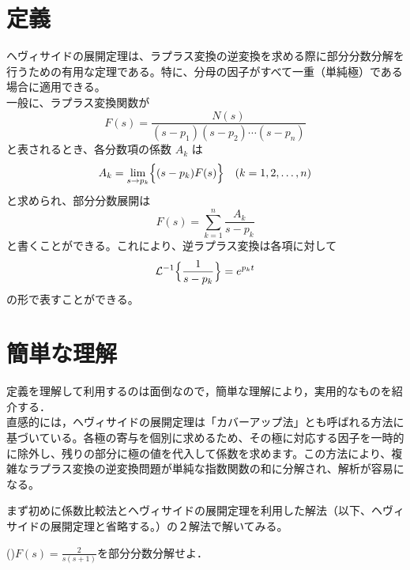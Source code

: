 \documentclass[a4paper,12pt]{report}
\begin{document}
\chapter{定義}
ヘヴィサイドの展開定理は、ラプラス変換の逆変換を求める際に部分分数分解を行うための有用な定理である。特に、分母の因子がすべて一重（単純極）である場合に適用できる。\\[1ex]
一般に、ラプラス変換関数が
\[
F(s) = \frac{N(s)}{(s-p_1)(s-p_2)\cdots(s-p_n)}
\]
と表されるとき、各分数項の係数 \(A_k\) は
\[
A_k = \lim_{s\to p_k}\Bigl\{(s-p_k)F(s)\Bigr\}\quad (k=1,2,\dots,n)
\]
と求められ、部分分数展開は
\[
F(s) = \sum_{k=1}^{n}\frac{A_k}{s-p_k}
\]
と書くことができる。これにより、逆ラプラス変換は各項に対して
\[
\mathcal{L}^{-1}\Bigl\{\frac{1}{s-p_k}\Bigr\} = e^{p_k t}
\]
の形で表すことができる。

\newpage

\chapter{簡単な理解}
定義を理解して利用するのは面倒なので，簡単な理解により，実用的なものを紹介する．\\
直感的には，ヘヴィサイドの展開定理は「カバーアップ法」とも呼ばれる方法に基づいている。各極の寄与を個別に求めるため、その極に対応する因子を一時的に除外し、残りの部分に極の値を代入して係数を求めます。この方法により、複雑なラプラス変換の逆変換問題が単純な指数関数の和に分解され、解析が容易になる。\\

\vspace{2mm}

まず初めに係数比較法とヘヴィサイドの展開定理を利用した解法（以下、ヘヴィサイドの展開定理と省略する。）の２解法で解いてみる。

\vspace{6mm}

(\MakeUppercase{})\(F(s) =  \frac{2}{s(s+1)}\)を部分分数分解せよ．

\vspace{6mm}
\end{document}
